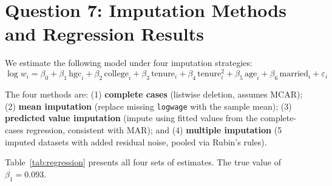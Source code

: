 \documentclass[12pt]{article}
\begin{document}
\section*{Question 7: Imputation Methods and Regression Results}

We estimate the following model under four imputation strategies:
\begin{equation}
\log w_i = \beta_0 + \beta_1\,\text{hgc}_i + \beta_2\,\text{college}_i
         + \beta_3\,\text{tenure}_i + \beta_4\,\text{tenure}_i^2
         + \beta_5\,\text{age}_i + \beta_6\,\text{married}_i + \varepsilon_i
\end{equation}

The four methods are: (1) \textbf{complete cases} (listwise deletion,
assumes MCAR); (2) \textbf{mean imputation} (replace missing
\texttt{logwage} with the sample mean); (3) \textbf{predicted value
imputation} (impute using fitted values from the complete-cases
regression, consistent with MAR); and (4) \textbf{multiple imputation}
(5 imputed datasets with added residual noise, pooled via Rubin's rules).

Table~\ref{tab:regression} presents all four sets of estimates.
The true value of $\beta_1 = 0.093$.
\end{document}
